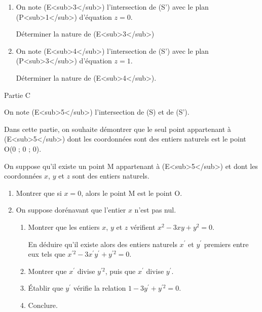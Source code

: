 \begin{enumerate}
     \item
     On note (E<sub>3</sub>) l'intersection de (S') avec le plan (P<sub>1</sub>) d'équation $z=0$.
     \par
     Déterminer la nature de (E<sub>3</sub>)
     \item
     On note (E<sub>4</sub>) l'intersection de (S') avec le plan (P<sub>3</sub>) d'équation $z=1$.
     \par
     Déterminer la nature de (E<sub>4</sub>).
\end{enumerate}
\begin{h3}Partie C\end{h3}
On note (E<sub>5</sub>) l'intersection de (S) et de (S').
\par
Dans cette partie, on souhaite démontrer que le seul point appartenant à (E<sub>5</sub>) dont les coordonnées sont des entiers naturels est le point O(0 ; 0 ; 0).
\par
On suppose qu'il existe un point M appartenant à (E<sub>5</sub>) et dont les coordonnées $x$, $y$ et $z$ sont des entiers naturels.
\begin{enumerate}
     \item
     Montrer que si $x=0$, alors le point M est le point O.
     \item
     On suppose dorénavant que l'entier $x$ n'est pas nul.
     \begin{enumerate}
          \item
          Montrer que les entiers $x$, $y$ et $z$ vérifient $x^{2}-3xy+y^{2}=0$.
          \par
          En déduire qu'il existe alors des entiers naturels $x^{\prime}$ et $y^{\prime}$ premiers entre eux tels que $x^{\prime 2}-3x^{\prime}y^{\prime}+y^{\prime 2}=0$.
          \item
          Montrer que $x^{\prime}$ divise $y^{\prime 2}$, puis que $x^{\prime}$ divise $y^{\prime}$.
          \item
          Établir que $y^{\prime}$ vérifie la relation $1-3y^{\prime}+y^{\prime 2}=0$.
          \item
          Conclure.
     \end{enumerate}
\end{enumerate}
